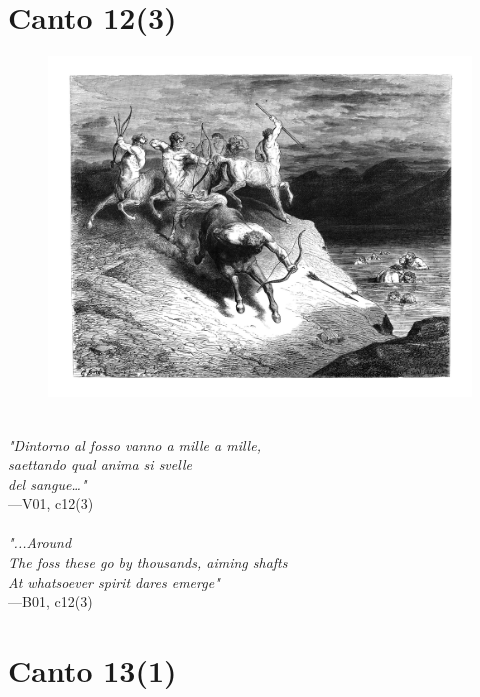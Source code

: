 \documentclass[../Dore_vision.tex]{subfiles}
\begin{document}
\newpage

\section{Canto 12(3)}

\begin{figure}[ht]
\centering
\includegraphics[height=\figsize]{illustrations/book_1/V01, c12(3).jpg}
\end{figure}

\begin{center}
\begin{minipage}{0.8\linewidth}
\textit{\\
"Dintorno al fosso vanno a mille a mille,\\saettando qual anima si svelle\\del sangue…"} \\
—V01, c12(3) \\~\\
\textit{"...Around\\The foss these go by thousands, aiming shafts\\At whatsoever spirit dares emerge"} \\
—B01, c12(3)
\end{minipage}
\end{center}

\newpage

\section{Canto 13(1)}
\end{document}
